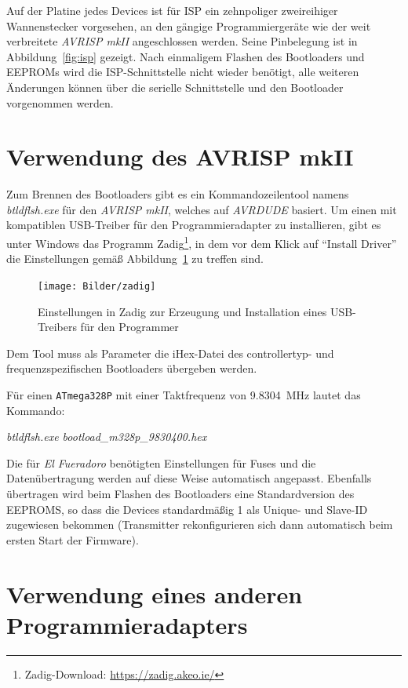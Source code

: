 \documentclass[paper=a4, parskip, numbers=noenddot, toc=listof, headsepline]{scrbook}
\newcommand{\anlage}{\emph{El Fueradoro}}
\begin{document}
		Auf der Platine jedes Devices ist für ISP ein zehnpoliger zweireihiger Wannenstecker vorgesehen, an den gängige Programmiergeräte wie der weit verbreitete \emph{AVRISP mkII} angeschlossen werden. Seine Pinbelegung ist in Abbildung~\ref{fig:isp} gezeigt. Nach einmaligem Flashen des Bootloaders und EEPROMs wird die ISP-Schnittstelle nicht wieder benötigt, alle weiteren Änderungen können über die serielle Schnittstelle und den Bootloader vorgenommen werden.

		\section{Verwendung des AVRISP mkII}

			Zum Brennen des Bootloaders gibt es ein Kommandozeilentool namens \emph{btldflsh.exe} für den \emph{AVRISP mkII}, welches auf \emph{AVRDUDE} basiert. Um einen mit kompatiblen USB-Treiber für den Programmieradapter zu installieren, gibt es unter Windows das Programm Zadig\footnote{Zadig-Download: \url{https://zadig.akeo.ie/}}, in dem vor dem Klick auf \enquote{Install Driver} die Einstellungen gemäß Abbildung~\ref{fig:zadig} zu treffen sind.
			
			\begin{figure}
				\centering
				\texttt{[image: Bilder/zadig]}
				\caption{Einstellungen in Zadig zur Erzeugung und Installation eines USB-Treibers für den Programmer}
				\label{fig:zadig}
			\end{figure}
			
			Dem Tool muss als Parameter die iHex-Datei des controllertyp- und frequenzspezifischen Bootloaders übergeben werden.

			Für einen \texttt{ATmega328P} mit einer Taktfrequenz von \SI{9,8304}{\mega\hertz} lautet das Kommando:

			\begin{center}
				\emph{btldflsh.exe bootload\_m328p\_9830400.hex}
			\end{center}

			Die für {\anlage} benötigten Einstellungen für Fuses und die Datenübertragung werden auf diese Weise automatisch angepasst. Ebenfalls übertragen wird beim Flashen des Bootloaders eine Standardversion des EEPROMS, so dass die Devices standardmäßig 1 als Unique- und Slave-ID zugewiesen bekommen (Transmitter rekonfigurieren sich dann automatisch beim ersten Start der Firmware).

		\section{Verwendung eines anderen Programmieradapters}
\end{document}
